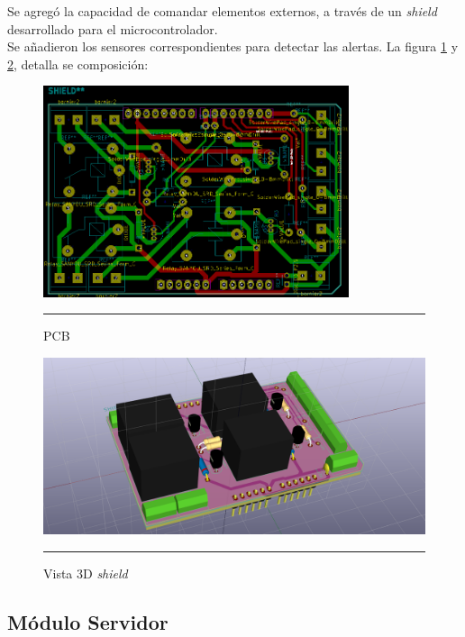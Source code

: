Se agregó la capacidad de comandar elementos externos, a través de un \textit{shield} desarrollado para el microcontrolador.\\
Se añadieron los sensores correspondientes para detectar las alertas.
La figura \ref{pcb} y \ref{relay_shield}, detalla se composición:\\
\begin{figure}[htbp]
	\centering
		\includegraphics[width=0.8\textwidth]{Figures/pcb.png}
		\rule{35em}{1.5pt}
	\caption[PCB]{PCB}
\label{pcb}
\end{figure}

\begin{figure}[htbp]
	\centering
		\includegraphics[width=1\textwidth]{Figures/relay_shield.png}
		\rule{35em}{1.5pt}
	\caption[Vista 3D \textit{shield}]{Vista 3D \textit{shield}}
\label{relay_shield}
\end{figure}
\newpage


\subsection{Módulo Servidor}

